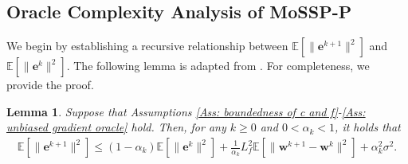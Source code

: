 \documentclass{article}
\theoremstyle{plain}
\newtheorem{lemma}{Lemma}[section]
\theoremstyle{definition}
\theoremstyle{remark}
\newcommand{\EE}{\mathbb{E}}
\newcommand{\be}{\bm{e}}
\newcommand{\bw}{\bm{w}}
\numberwithin{equation}{section}
\begin{document}
\subsection{\bf{Oracle Complexity Analysis of MoSSP-P}}
\label{Subsection: Lemmas for Oracle complexity analysis of Algo 1}
We begin by establishing a recursive relationship between $\EE[\|\be^{k+1}\|^{2}]$ and $\EE[\|\be^{k}\|^{2}]$.
The following lemma is adapted from \citep[Lemma 5.2,][]{gao2024non}. For completeness, we provide the proof.
\begin{lemma}
    \label{Lemma: Recursive gradient error with Polyak momentum}
    Suppose that Assumptions \ref{Ass: boundedness of c and f}-\ref{Ass: unbiased gradient oracle} hold. Then, for any $k \geq 0$ and $0 < \alpha_k < 1$, it holds that
    \begin{align}
        \label{Eq: the recursive gradient relationship in Polyak momentum scheme}
        \EE[\|\be^{k+1}\|^{2}] \leq (1 - \alpha_{k})\EE[\|\be^{k}\|^{2}] + \frac{1}{\alpha_{k}}L^2_{f}\EE[\|\bw^{k+1}- \bw^{k}\|^{2}] + \alpha_{k}^{2}\sigma^{2}.
\end{align}

\end{lemma}
\end{document}
